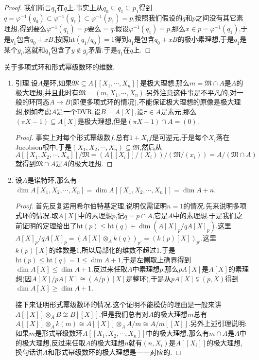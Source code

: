 \begin{enumerate}
\begin{proof}
		我们断言$q_1$在$q$上.事实上从$q_0\subseteq q_1\subseteq p_1$得到$q=\varphi^{-1}(q_0)\subset\varphi^{-1}(q_1)\subset\varphi^{-1}(p_1)=p$,按照我们假设的$q$和$p$之间没有其它素理想,得到要么$\varphi^{-1}(q_1)=p$要么$=q$.假设$\varphi^{-1}(q_1)=p$,那么$x\in p=\varphi^{-1}(q_1)$,于是$q_1$包含$q_0+xB$,按照$\mathrm{ht}(q_1/q_0)=1$得到$q_1$是包含$q_0+xB$的极小素理想,于是$q_1$是某个$g_i$,这就和$q_1$包含了$y\not\in g_i$矛盾.于是$q_1$在$q$上.
	\end{proof}
\end{enumerate}

关于多项式环和形式幂级数环的维数.
\begin{enumerate}
	\item 引理.设$A$是环,如果$\mathfrak{M}\subseteq A[[X_1,\cdots,X_n]]$是极大理想,那么$m=\mathfrak{M}\cap A$是$A$的极大理想,并且此时有$\mathfrak{M}=(m,X_1,\cdots,X_n)$.另外注意这件事是不平凡的,对一般的环同态$A\to B$(即便多项式环的情况),不能保证极大理想的原像是极大理想,例如考虑$A$是一个DVR,设$B=A[X]$,设$\pi\in A$是素元,那么$(\pi X-1)\subseteq A[X]$是极大理想,但是$(\pi X-1)\cap A=(0)$.
	\begin{proof}
		
		事实上对每个形式幂级数$f$,总有$1+X_if$是可逆元,于是每个$X_i$落在Jacobson根中,于是$(X_1,X_2,\cdots,X_n)\subseteq\mathfrak{M}$,然后从$A[[X_1,X_2,\cdots,X_n]]/\mathfrak{M}=(A[[X_i]]/(X_i))/(\mathfrak{M}/(x_i))=A/(\mathfrak{M}\cap A)$就得到$\mathfrak{M}\cap A$是$A$的极大理想.
	\end{proof}
	\item 设$A$是诺特环,那么有$\dim A[X_1,X_2,\cdots,X_n]=\dim A[[X_1,X_2,\cdots,X_n]]=\dim A+n$.
	\begin{proof}
		
		首先反复运用希尔伯特基定理,说明仅需证明$n=1$的情况.先来说明多项式环的情况.取$A[X]$中的素理想$p$,记$q=p\cap A$,它是$A$中的素理想.于是我们之前证明的定理给出了$\mathrm{ht}(p)\le\mathrm{ht}(q)+\dim(A[X]_p/qA[X]_p)$.这里$A[X]_p/qA[X]_p=(A[X]\otimes_Ak(q))_{p'}=(k(p)[X])_{p'}$.这里$k(p)[X]$的维数是1,所以局部化的维数不超过1.于是$\mathrm{ht}(p)\le\mathrm{ht}(q)=1\le\dim A+1$,于是左侧取上确界得到$\dim A[X]\le\dim A+1$.反过来任取$A$中素理想$p$,那么$pA[X]$是$A[X]$的素理想(因$A[X]/pA[X]\cong(A/p)[X]$是整环),于是从$pA[X]\subsetneqq(p,X)$得到$\dim A[X]\ge\dim A+1$.
		
		\qquad
		
		接下来证明形式幂级数环的情况.这个证明不能模仿的理由是一般来讲$A[[X]]\otimes_AB\not\cong B[[X]]$.但是我们总有对$A$的极大理想$m$总有$A[[X]]\otimes_Ak(m)\cong A[[X]]\otimes_AA/m\cong A/m[[X]]$.另外上述引理说明:如果$m$是形式幂级数环$A[[X_1,X_2,\cdots,X_n]]$中的极大理想,那么有$m\cap A$是$A$中的极大理想,反过来任取$A$的极大理想$n$就有$(n,X_i)$是$A[[X_i]]$的极大理想,换句话讲$A$和形式幂级数环的极大理想是一一对应的.
		

\end{proof}
\end{enumerate}

